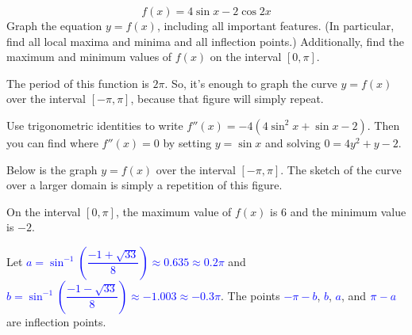 \begin{question}[2010H]\label{s3.6.6trig2}
\[ f(x) = 4\sin x - 2\cos 2x\]
 Graph the equation $y = f(x)$,
including all important features. (In particular, find all local maxima and
minima and all inflection points.)
Additionally, find the maximum and minimum values of $f(x)$ on the interval $[0,\pi]$.
\end{question}
\begin{hint}
The period of this function is $2\pi$. So, it's enough to graph the curve $y=f(x)$ over the interval $[-\pi,\pi]$, because that figure will simply repeat.

Use trigonometric identities to write $f''(x)=-4(4\sin^2 x + \sin x -2)$. Then you can find where $f''(x)=0$ by setting $y=\sin x$ and solving $0=4y^2+y-2$.
\end{hint}
\begin{answer}
Below is the graph $y=f(x)$ over the interval $[-\pi,\pi]$. The sketch of the curve over a larger domain is simply a repetition of this figure.

\begin{center}\end{center}
On the interval $[0,\pi]$, the maximum value of $f(x)$ is $6$ and the minimum value is $-2$.

Let \textcolor{blue}{$a=\sin^{-1}\left(\dfrac{-1+\sqrt{33}}{8}\right)\approx 0.635\approx0.2\pi$} and
\textcolor{blue}{$b=\sin^{-1}\left(\dfrac{-1-\sqrt{33}}{8}\right)\approx -1.003\approx -0.3\pi$}. The points \textcolor{blue}{$-\pi-b$}, \textcolor{blue}{$b$}, \textcolor{blue}{$a$}, and $\textcolor{blue}{\pi-a}$ are inflection points.

\end{answer}
